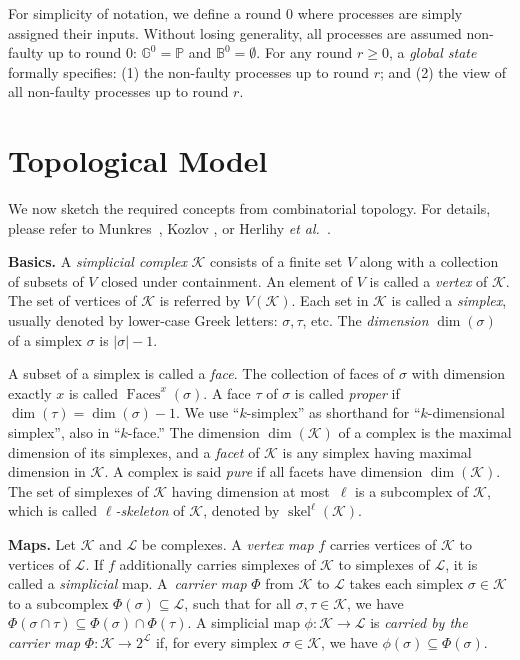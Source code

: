 \documentclass[11pt]{article}
\newcommand{\cK}{\ensuremath{\mathcal{K}}}
\newcommand{\cL}{\ensuremath{\mathcal{L}}}
\newcommand{\bbB}{\ensuremath{\mathbb{B}}}
\newcommand{\bbG}{\ensuremath{\mathbb{G}}}
\newcommand{\bbP}{\ensuremath{\mathbb{P}}}
\DeclareMathOperator{\Faces}{Faces}
\DeclareMathOperator{\skel}{skel}
\begin{document}
For simplicity of notation,
we define a round $0$ where processes are simply assigned their inputs.
Without losing generality,
all processes are assumed non-faulty up to round $0$:
$\bbG^0 = \bbP$ and $\bbB^0 = \emptyset$.
For any round $r \ge 0$,
a \emph{global state} formally specifies:
(1) the non-faulty processes up to round $r$;
and (2) the view of all non-faulty processes up to round $r$.

\section{Topological Model}
\label{Sec-TopologicalModel}

We now sketch the required concepts from combinatorial topology.
For details, please refer to Munkres~\cite{Munkres84}, Kozlov \cite{Kozlov07}, or Herlihy \emph{et al.}~\cite{MauriceBook}.





\textbf{Basics. }
A \emph{simplicial complex} $\cK$ consists of a finite set $V$
along with a collection of subsets of $V$ closed under containment.
An element of $V$ is called a \emph{vertex} of $\cK$.
The set of vertices of $\cK$ is referred by $V(\cK)$.
Each set in $\cK$ is called a \emph{simplex},
usually denoted by lower-case Greek letters: $\sigma, \tau$, etc.
The \emph{dimension} $\dim(\sigma)$ of a simplex $\sigma$ is $|\sigma|-1$.

A subset of a simplex is called a \emph{face}.
The collection of faces of $\sigma$ with dimension exactly $x$ is called $\Faces^x(\sigma)$.
A face $\tau$ of $\sigma$ is called \emph{proper} if $\dim(\tau) = \dim(\sigma) - 1$.
We use ``$k$-simplex'' as shorthand for ``$k$-dimensional simplex'',
also in ``$k$-face.''
The dimension $\dim(\cK)$ of a complex is the maximal dimension of its simplexes,
and a \emph{facet} of $\cK$ is any simplex having maximal dimension in $\cK$.
A complex is said \emph{pure} if all facets have dimension $\dim(\cK)$.
The set of simplexes of $\cK$
having dimension at most~$\ell$ is a subcomplex of $\cK$,
which is called \emph{$\ell$-skeleton} of $\cK$,
denoted by $\skel^\ell(\cK)$.
 


\textbf{Maps. }
Let $\cK$ and $\cL$ be complexes.
A \emph{vertex map} $f$ carries vertices of $\cK$ to vertices of $\cL$.
If $f$ additionally carries simplexes of $\cK$ to simplexes of $\cL$,
it is called a \emph{simplicial} map.
A~\emph{carrier map} $\Phi$ from $\cK$ to $\cL$ takes each
simplex $\sigma\in\cK$ to a subcomplex $\Phi(\sigma) \subseteq \cL$,
such that for all $\sigma,\tau \in \cK$,
we have $\Phi(\sigma \cap \tau) \subseteq \Phi(\sigma) \cap \Phi(\tau)$.
A simplicial map $\phi: \cK \to \cL$ is \emph{carried by the carrier map}
$\Phi: \cK \to 2^{\cL}$ if, for every simplex $\sigma \in \cK$,
we have $\phi(\sigma) \subseteq \Phi(\sigma)$.
\end{document}
